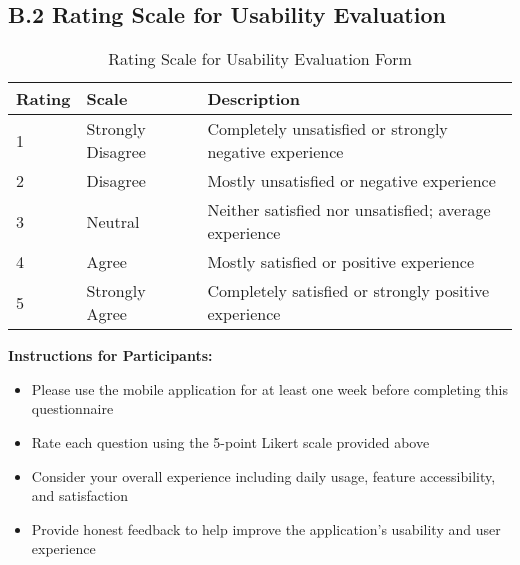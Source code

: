 \subsection*{B.2 Rating Scale for Usability Evaluation}

\begin{table}[H]
\centering
\caption{Rating Scale for Usability Evaluation Form}
\label{tab:rating-scale}
\begin{tabular}{|p{1.5cm}|p{4cm}|p{8cm}|}
\hline
\textbf{Rating} & \textbf{Scale} & \textbf{Description} \\
\hline
1 & Strongly Disagree & Completely unsatisfied or strongly negative experience \\
\hline
2 & Disagree & Mostly unsatisfied or negative experience \\
\hline
3 & Neutral & Neither satisfied nor unsatisfied; average experience \\
\hline
4 & Agree & Mostly satisfied or positive experience \\
\hline
5 & Strongly Agree & Completely satisfied or strongly positive experience \\
\hline
\end{tabular}
\end{table}

\textbf{Instructions for Participants:}
\begin{itemize}
    \item Please use the mobile application for at least one week before completing this questionnaire
    \item Rate each question using the 5-point Likert scale provided above
    \item Consider your overall experience including daily usage, feature accessibility, and satisfaction
    \item Provide honest feedback to help improve the application's usability and user experience
\end{itemize}
